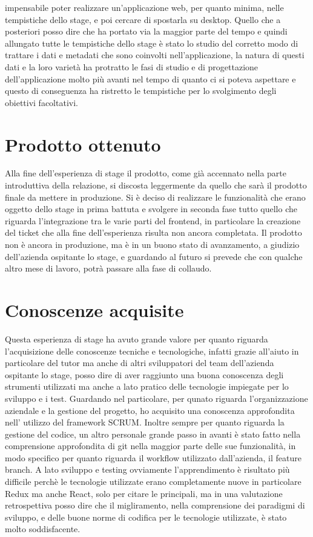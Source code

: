 impensabile poter realizzare un'applicazione web, per quanto minima, nelle tempistiche dello stage, e poi cercare di spostarla su desktop. Quello che a posteriori posso dire che
ha portato via la maggior parte del tempo e quindi allungato tutte le tempistiche dello stage è stato lo studio del corretto modo di trattare i dati e metadati che sono coinvolti
nell'applicazione, la natura di questi dati e la loro varietà ha protratto le fasi di studio e di progettazione dell'applicazione molto più avanti nel tempo di quanto ci si poteva
aspettare e questo di conseguenza ha ristretto le tempistiche per lo svolgimento degli obiettivi facoltativi.

\section{Prodotto ottenuto}
\label{sec:prodotto-ottenuto}
Alla fine dell'esperienza di stage il prodotto, come già accennato nella parte introduttiva della relazione, si discosta leggermente da quello che sarà il prodotto finale da
mettere in produzione. Si è deciso di realizzare le funzionalità che erano oggetto dello stage in prima battuta e svolgere in seconda fase tutto quello che riguarda
l'integrazione tra le varie parti del frontend, in particolare la creazione del ticket che alla fine dell'esperienza risulta non ancora completata.
Il prodotto non è ancora in produzione, ma è in un buono stato di avanzamento, a giudizio dell'azienda ospitante lo stage, e guardando al futuro si prevede che con qualche altro mese di
lavoro, potrà passare alla fase di collaudo.

\section{Conoscenze acquisite}
\label{sec:conoscenze-acquisite}
Questa esperienza di stage ha avuto grande valore per quanto riguarda l'acquisizione delle conoscenze tecniche e tecnologiche, infatti grazie all'aiuto in particolare del tutor ma anche
di altri sviluppatori del team dell'azienda ospitante lo stage, posso dire di aver raggiunto una buona conoscenza degli strumenti utilizzati ma anche a lato pratico delle tecnologie
impiegate per lo sviluppo e i test. Guardando nel particolare, per qunato riguarda l'organizzazione aziendale e la gestione del progetto, ho acquisito una conoscenza approfondita nell'
utilizzo del framework SCRUM. Inoltre sempre per quanto riguarda la gestione del codice, un altro personale grande passo in avanti è stato fatto nella comprensione approfondita
di git nella maggior parte delle sue funzionalità, in modo specifico per quanto riguarda il workflow utilizzato dall'azienda, il feature branch. A lato sviluppo e testing ovviamente l'apprendimento
è risultato più difficile perchè le tecnologie utilizzate erano completamente nuove in particolare Redux ma anche React, solo per citare le principali, ma in una valutazione retrospettiva
posso dire che il migliramento, nella comprensione dei paradigmi di sviluppo, e delle buone norme di codifica per le tecnologie utilizzate, è stato molto soddisfacente.

